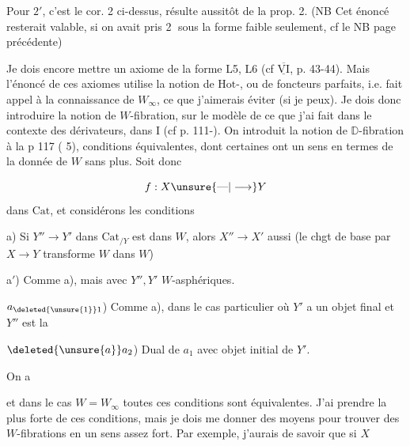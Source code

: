 
Pour $2'$, c'est le cor. 2 ci-dessus,  résulte aussitôt de la prop. 2. (NB Cet énoncé resterait valable, si on avait pris \textcircled{2} sous la forme faible seulement, cf le NB page précédente)

Je dois encore mettre un axiome de la forme L5, L6 (cf $\overline{\underline{\mathrm{VI}}}$, p. 43-44). Mais l'énoncé de ces axiomes utilise la notion de $\mathrm{Hot}$-, ou de  foncteurs parfaits, i.e. fait appel à la connaissance de $W_\infty$, ce que j'aimerais éviter (si je peux). Je dois donc introduire la notion de $W$-fibration, sur le modèle de ce que j'ai fait dans le contexte des dérivateurs, dans I (cf p. 111-). On introduit la notion de $\mathbb{D}$-fibration à la p 117 ( 5),  conditions équivalentes, dont certaines ont un sens en termes de la donnée de $W$ sans plus. Soit donc 

\[
f:X\unsure{\text{---}|\longrightarrow}Y
\]
 dans $\mathrm{Cat}$, et considérons les conditions

a) Si $Y''\longrightarrow Y'$ dans $\mathrm{Cat}_{/Y}$ est dans $W$, alors $X''\longrightarrow X'$ aussi (le chgt de base par $X\longrightarrow Y$ transforme $W$ dans $W$)

a$'$) Comme a), mais avec $Y'',Y'$ $W$-asphériques.

$a_{\deleted{\unsure{1}}1}$) Comme a), dans le cas particulier où $Y'$ a un objet final  et $Y''$  est la  

$\deleted{\unsure{a}}a_2$) Dual de $a_1$ avec objet initial de $Y'$.

On a 

et dans le cas $W=W_\infty$ toutes ces conditions sont équivalentes. J'ai  prendre la plus forte de ces conditions, mais je dois me donner des moyens pour trouver des $W$-fibrations en un sens assez fort. Par exemple, j'aurais  de savoir que si $X$

